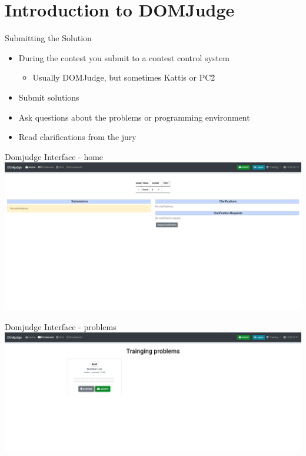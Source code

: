 \documentclass[11pt,pdf, aspectratio=169]{beamer}
\begin{document}
  \section{Introduction to DOMJudge}
  \begin{frame}{Submitting the Solution}
    \begin{itemize}
      \item During the contest you submit to a contest control system
      \begin{itemize}
        \item Usually DOMJudge, but sometimes Kattis or PC\^ 2
      \end{itemize}
      \item Submit solutions
      \item Ask questions about the problems or programming environment
      \item Read clarifications from the jury
    \end{itemize}
  \end{frame}
  \begin{frame}{Domjudge Interface - home}
    \includegraphics[width=\linewidth]{images/session-1/domjudge-initial}
  \end{frame}
  \begin{frame}{Domjudge Interface - problems}
    \includegraphics[width=\linewidth]{images/session-1/domjudge-problems}
  \end{frame}
\end{document}
